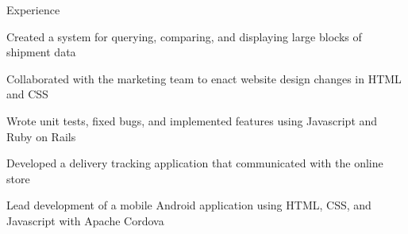 \documentclass[]{deedy-resume-openfont}
\begin{document}
\begin{resumesection}{Experience}
\newline
{}\hfill{}
\vspace{-5pt}
\begin{tightemize}
	\item Created a system for querying, comparing, and displaying large blocks of shipment data
	\item Collaborated with the marketing team to enact website design changes in HTML and CSS
	\item Wrote unit tests, fixed bugs, and implemented features using Javascript and Ruby on Rails
    \item Developed a delivery tracking application that communicated with the online store
\end{tightemize}
\vspace{-2pt}
\newline
{}
\vspace{-5pt}
\begin{tightemize}
	\item Lead development of a mobile Android application using HTML, CSS, and Javascript with Apache Cordova
\end{tightemize}

\vspace{-8pt}
\end{resumesection}
%
%
\end{document}
